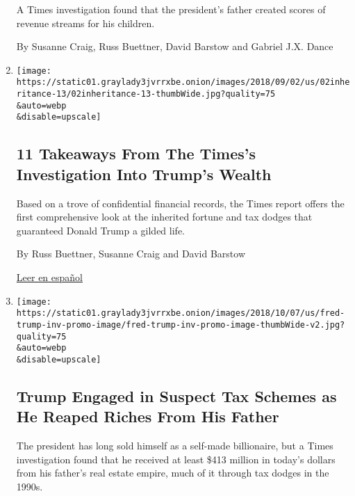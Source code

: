 \begin{enumerate}
  A Times investigation found that the president's father created scores
  of revenue streams for his children.

  By Susanne Craig, Russ Buettner, David Barstow and Gabriel J.X. Dance
\item
  \href{/2018/10/02/us/politics/donald-trump-wealth-fred-trump.html}{}

  \texttt{[image: https://static01.graylady3jvrrxbe.onion/images/2018/09/02/us/02inheritance-13/02inheritance-13-thumbWide.jpg?quality=75\\\&auto=webp\\\&disable=upscale]}

  \hypertarget{11-takeaways-from-the-timess-investigation-into-trumps-wealth}{%
  \subsection{11 Takeaways From The Times's Investigation Into Trump's
  Wealth}\label{11-takeaways-from-the-timess-investigation-into-trumps-wealth}}

  Based on a trove of confidential financial records, the Times report
  offers the first comprehensive look at the inherited fortune and tax
  dodges that guaranteed Donald Trump a gilded life.

  By Russ Buettner, Susanne Craig and David Barstow

  \href{https://www.nytimes3xbfgragh.onion/es/2018/10/02/investigacion-fortuna-donald-trump/?}{Leer
  en español}
\item
  \href{/interactive/2018/10/02/us/politics/donald-trump-tax-schemes-fred-trump.html}{}

  \texttt{[image: https://static01.graylady3jvrrxbe.onion/images/2018/10/07/us/fred-trump-inv-promo-image/fred-trump-inv-promo-image-thumbWide-v2.jpg?quality=75\\\&auto=webp\\\&disable=upscale]}

  \hypertarget{trump-engaged-in-suspect-tax-schemes-as-he-reaped-riches-from-his-father}{%
  \subsection{Trump Engaged in Suspect Tax Schemes as He Reaped Riches
  From His
  Father}\label{trump-engaged-in-suspect-tax-schemes-as-he-reaped-riches-from-his-father}}

  The president has long sold himself as a self-made billionaire, but a
  Times investigation found that he received at least \$413 million in
  today's dollars from his father's real estate empire, much of it
  through tax dodges in the 1990s.


\end{enumerate}

